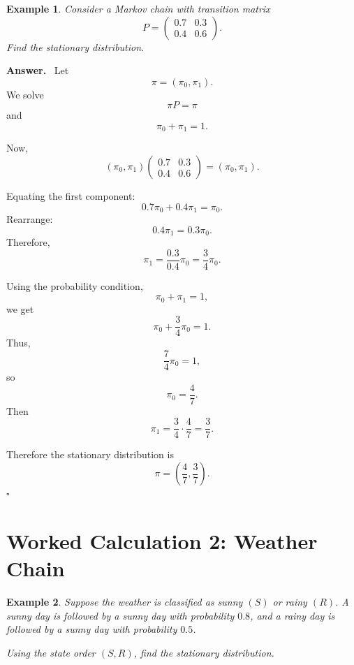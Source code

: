 \documentclass[12pt,a4paper]{article}
\theoremstyle{notestyle}
\newtheorem{example}{Example}
\newenvironment{answer}
{\par\textbf{Answer.}\ }
{\hfill$\square$\par}
\begin{document}
\begin{example}
Consider a Markov chain with transition matrix
\[
P=
\begin{pmatrix}
0.7 & 0.3\\
0.4 & 0.6
\end{pmatrix}.
\]
Find the stationary distribution.
\end{example}

\begin{answer}
Let
\[
\pi=(\pi_0,\pi_1).
\]
We solve
\[
\pi P=\pi
\]
and
\[
\pi_0+\pi_1=1.
\]

Now,
\[
(\pi_0,\pi_1)
\begin{pmatrix}
0.7 & 0.3\\
0.4 & 0.6
\end{pmatrix}
=
(\pi_0,\pi_1).
\]

Equating the first component:
\[
0.7\pi_0+0.4\pi_1=\pi_0.
\]
Rearrange:
\[
0.4\pi_1=0.3\pi_0.
\]
Therefore,
\[
\pi_1=\frac{0.3}{0.4}\pi_0=\frac34\pi_0.
\]

Using the probability condition,
\[
\pi_0+\pi_1=1,
\]
we get
\[
\pi_0+\frac34\pi_0=1.
\]
Thus,
\[
\frac74\pi_0=1,
\]
so
\[
\pi_0=\frac47.
\]
Then
\[
\pi_1=\frac34\cdot\frac47=\frac37.
\]

Therefore the stationary distribution is
\[
\boxed{\pi=\left(\frac47,\frac37\right).}
\]
\end{answer}

\section{Worked Calculation 2: Weather Chain}

\begin{example}
Suppose the weather is classified as sunny $(S)$ or rainy $(R)$. A sunny day is followed by a sunny day with probability $0.8$, and a rainy day is followed by a sunny day with probability $0.5$.

Using the state order $(S,R)$, find the stationary distribution.
\end{example}
\end{document}
